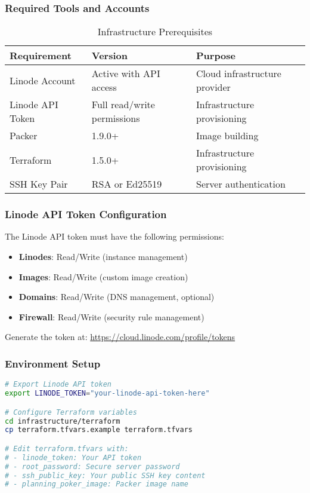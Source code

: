 \documentclass[11pt,a4paper]{article}
\begin{document}
\subsubsection{Required Tools and Accounts}

\begin{table}[H]
\centering
\begin{tabular}{@{}lll@{}}
\toprule
\textbf{Requirement} & \textbf{Version} & \textbf{Purpose} \\
\midrule
Linode Account & Active with API access & Cloud infrastructure provider \\
Linode API Token & Full read/write permissions & Infrastructure provisioning \\
Packer & 1.9.0+ & Image building \\
Terraform & 1.5.0+ & Infrastructure provisioning \\
SSH Key Pair & RSA or Ed25519 & Server authentication \\
\bottomrule
\end{tabular}
\caption{Infrastructure Prerequisites}
\label{tab:infra-prerequisites}
\end{table}

\subsubsection{Linode API Token Configuration}

The Linode API token must have the following permissions:

\begin{itemize}
    \item \textbf{Linodes}: Read/Write (instance management)
    \item \textbf{Images}: Read/Write (custom image creation)
    \item \textbf{Domains}: Read/Write (DNS management, optional)
    \item \textbf{Firewall}: Read/Write (security rule management)
\end{itemize}

Generate the token at: \url{https://cloud.linode.com/profile/tokens}

\subsubsection{Environment Setup}

\begin{lstlisting}[language=bash, caption=Environment Configuration]
# Export Linode API token
export LINODE_TOKEN="your-linode-api-token-here"

# Configure Terraform variables
cd infrastructure/terraform
cp terraform.tfvars.example terraform.tfvars

# Edit terraform.tfvars with:
# - linode_token: Your API token
# - root_password: Secure server password
# - ssh_public_key: Your public SSH key content
# - planning_poker_image: Packer image name
\end{lstlisting}
\end{document}

